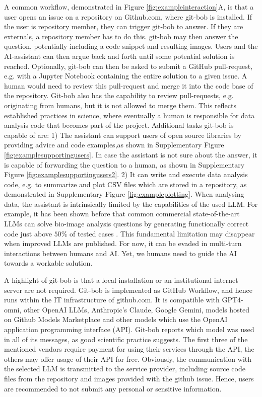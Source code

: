 \documentclass{ecai}
\begin{document}
A common workflow, demonstrated in Figure \ref{fig:exampleinteraction}A, is that a user opens an issue on a repository on Github.com, where git-bob is installed. If the user is repository member, they can trigger git-bob to answer. If they are externals, a repository member has to do this. git-bob may then answer the question, potentially including a code snippet and resulting images. Users and the AI-assistant can then argue back and forth until some potential solution is reached. Optionally, git-bob can then be asked to submit a GitHub pull-request, e.g. with a Jupyter Notebook containing the entire solution to a given issue. A human would need to review this pull-request and merge it into the code base of the repository. Git-bob also has the capability to review pull-requests, e.g. originating from humans, but it is not allowed to merge them. This reflects established practices in science, where eventually a human is responsible for data analysis code that becomes part of the project. Additional tasks git-bob is capable of are: 1) The assistant can support users of open source libraries by providing advice and code examples,as shown in Supplementary Figure \ref{fig:examplesupportingusers}. In case the assistant is not sure about the answer, it is capable of forwarding the question to a human, as shown in Supplementary Figure \ref{fig:examplesupportingusers2}. 2) It can write and execute data analysis code, e.g. to summarize and plot CSV files which are stored in a repository, as demonstrated in Supplementary Figure \ref{fig:exampleplotting}. When analysing data, the assistant is intrinsically limited by the capabilities of the used LLM. For example, it has been shown before that common commercial state-of-the-art LLMs can solve bio-image analysis questions by generating functionally correct code just above $50\%$ of tested cases \citep{benchmark_llm_bia}. This fundamental limitation may disappear when improved LLMs are published. For now, it can be evaded in multi-turn interactions between humans and AI. Yet, we humans need to guide the AI towards a workable solution. 

A highlight of git-bob is that a local installation or an institutional internet server are not required. Git-bob is implemented as GitHub Workflow, and hence runs within the IT infrastructure of github.com. It is compatible with GPT4-omni, other OpenAI LLMs, Anthropic's Claude, Google Gemini, models hosted on Github Models Marketplace and other models which use the OpenAI application programming interface (API). Git-bob reports which model was used in all of its messages, as good scientific practice suggests. The first three of the mentioned vendors require payment for using their services through the API, the others may offer usage of their API for free. Obviously, the communication with the selected LLM is transmitted to the service provider, including source code files from the repository and images provided with the github issue. Hence, users are recommended to not submit any personal or sensitive information. 
\end{document}
